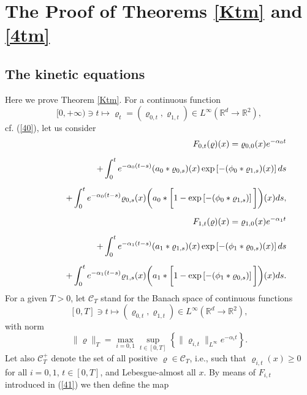 \documentclass[reqno,11pt]{amsart}
\theoremstyle{definition}
\theoremstyle{remark}
\numberwithin{equation}{section}
\begin{document}
\section{The Proof of Theorems \ref{Ktm} and \ref{4tm}}
\label{S6}

\subsection{The kinetic equations}
Here we prove Theorem \ref{Ktm}. For a continuous function
\[
[0,+\infty) \ni t \mapsto \varrho_t = (\varrho_{0,t}, \varrho_{1,t})
\in L^\infty (\mathds{R}^d \to \mathds{R}^2),
\]
cf. (\ref{40}), let us consider
\begin{eqnarray}
  \label{41}
& & F_{0,t}(\varrho)(x) = \varrho_{0,0}(x) e^{-\alpha_0 t} \\[.2cm] & & \quad \qquad +
\int_0^t e^{-\alpha_0(t-s)} (a_0 \ast \varrho_{0,s})(x)\exp\left[-
(\phi_0 \ast \varrho_{1,s})(x)\right] ds \nonumber \\[.2cm]
& & \quad \qquad + \int_0^t e^{-\alpha_0(t-s)} \varrho_{0,s}(x)
\bigg{(}a_0 \ast \bigg{[} 1- \exp\left[- (\phi_0 \ast
\varrho_{1,s})\right] \bigg{]} \bigg{)}(x) ds ,\nonumber \\[.2cm]
& & F_{1,t}(\varrho)(x) = \varrho_{1,0}(x) e^{-\alpha_1 t} \nonumber \\[.2cm] & & \quad \qquad +
\int_0^t e^{-\alpha_1(t-s)} (a_1 \ast \varrho_{1,s})(x)\exp\left[-
(\phi_1 \ast \varrho_{0,s})(x)\right] ds \nonumber \\[.2cm]
& & \quad \qquad + \int_0^t e^{-\alpha_1(t-s)} \varrho_{1,s}(x)
\bigg{(}a_1 \ast \bigg{[} 1- \exp\left[- (\phi_1 \ast
\varrho_{0,s})\right] \bigg{]} \bigg{)}(x) ds. \nonumber
\end{eqnarray}
For a given $T>0$, let $\mathcal{C}_T$ stand for the Banach space of
continuous functions
\begin{equation}
  \label{41a}
[0, T] \ni t \mapsto (\varrho_{0,t}, \varrho_{1,t}) \in L^\infty
(\mathds{R}^d \to \mathds{R}^2),
\end{equation}
with norm
\begin{equation}
  \label{42}
\|\varrho\|_T = \max_{i=0,1} \sup_{t\in [0,T]}\left\{
\|\varrho_{i,t}\|_{L^\infty} e^{-\alpha_i t}\right\}.
\end{equation}
Let also $\mathcal{C}_T^+$ denote the set of all positive
$\varrho\in \mathcal{C}_T$, i.e., such that $\varrho_{i,t}(x) \geq
0$ for all $i=0,1$, $t\in [0,T]$, and Lebesgue-almost all $x$. By
means of $F_{i,t}$ introduced in (\ref{41}) we then define the map
\end{document}
